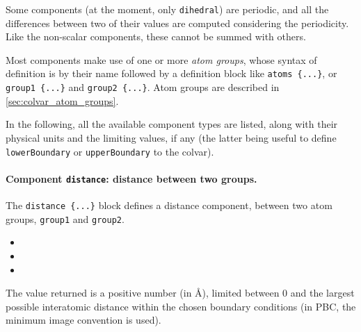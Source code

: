 Some components (at the moment, only \texttt{dihedral}) are periodic,
and all the differences between two of their values are computed
considering the periodicity.  Like the non-scalar components, these
cannot be summed with others.

Most components make use of one or more \emph{atom groups}, whose
syntax of definition is by their name followed by a definition block
like \texttt{atoms~\{...\}}, or \texttt{group1~\{...\}} and
\texttt{group2~\{...\}}.  Atom groups are described in
\ref{sec:colvar_atom_groups}.

In the following, all the available component types are listed, along
with their physical units and the limiting values, if any (the latter
being useful to define \texttt{lowerBoundary} or
\texttt{upperBoundary} to the colvar).


\paragraph*{Component \texttt{distance}: distance between two groups.}
The \texttt{distance \{...\}} block defines a distance component,
between two atom groups, \texttt{group1} and \texttt{group2}.
\begin{itemize}
\item %
\item %
\item %
\end{itemize}

The value returned is a positive number (in \AA), limited between $0$
and the largest possible interatomic distance within the chosen
boundary conditions (in PBC, the minimum image convention is used).


